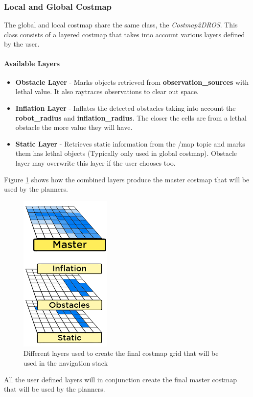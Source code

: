\documentclass[12pt]{article}
\begin{document}
\subsubsection{Local and Global Costmap}
The global and local costmap share the same class, the  \textit{Costmap2DROS}. This class consists of a layered costmap that takes into account various layers defined by the user.

\paragraph{Available Layers}
\begin{itemize}[label={}]
    \item \textbf{Obstacle Layer} - Marks objects retrieved from \textbf{observation\_sources} with lethal value. It also raytraces observations to clear out space.
    \item \textbf{Inflation Layer} - Inflates the detected obstacles taking into account the \textbf{robot\_radius} and \textbf{inflation\_radius}. The closer the cells are from a lethal obstacle the more value they will have.
    \item \textbf{Static Layer} - Retrieves static information from the /map topic and marks them has lethal objects (Typically only used in global costmap). Obstacle layer may overwrite this layer if the user chooses too.
\end{itemize}
Figure \ref{fig:layers} shows how the combined layers produce the master costmap that will be used by the planners.
\begin{figure}[!htb]
    \centering
    \includegraphics{layers.png}
    \caption{Different layers used to create the final costmap grid that will be used in the navigation stack}
    \label{fig:layers}
\end{figure}
All the user defined layers will in conjunction create the final master costmap that will be used by the planners.
\end{document}
